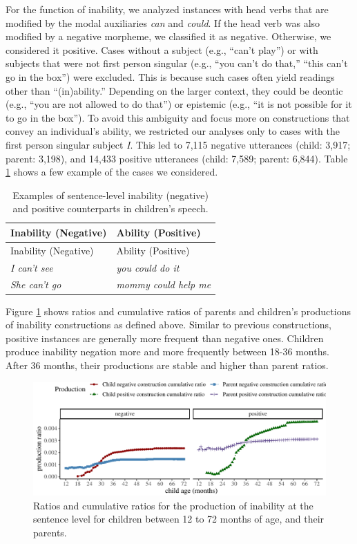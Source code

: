 \documentclass[
  english,
  man,floatsintext]{apa6}
\begin{document}
For the function of inability, we analyzed instances with head verbs that are modified by the modal auxiliaries \emph{can} and \emph{could}. If the head verb was also modified by a negative morpheme, we classified it as negative. Otherwise, we considered it positive. Cases without a subject (e.g., ``can't play'') or with subjects that were not first person singular (e.g., ``you can't do that,'' ``this can't go in the box'') were excluded. This is because such cases often yield readings other than ``(in)ability.'' Depending on the larger context, they could be deontic (e.g., ``you are not allowed to do that'') or epistemic (e.g., ``it is not possible for it to go in the box''). To avoid this ambiguity and focus more on constructions that convey an individual's ability, we restricted our analyses only to cases with the first person singular subject \emph{I}. This led to 7,115 negative utterances (child: 3,917; parent: 3,198), and 14,433 positive utterances (child: 7,589; parent: 6,844). Table \ref{tab:inab} shows a few example of the cases we considered.

\begin{longtable}[]{@{}ll@{}}
\caption{\label{tab:inab} Examples of sentence-level inability (negative) and positive counterparts in children's speech.}\tabularnewline
\toprule
Inability (Negative) & Ability (Positive) \\
\midrule
\endfirsthead
\toprule
Inability (Negative) & Ability (Positive) \\
\midrule
\endhead
\emph{I can't see} & \emph{you could do it} \\
\emph{She can't go} & \emph{mommy could help me} \\
\bottomrule
\end{longtable}

Figure \ref{fig:inability} shows ratios and cumulative ratios of parents and children's productions of inability constructions as defined above. Similar to previous constructions, positive instances are generally more frequent than negative ones. Children produce inability negation more and more frequently between 18-36 months. After 36 months, their productions are stable and higher than parent ratios.

\begin{figure}[H]

{\centering \includegraphics{neg_construction_article_files/figure-latex/inability-1} 

}

\caption{Ratios and cumulative ratios for the production of inability at the sentence level for children between 12 to 72 months of age, and their parents.}\label{fig:inability}
\end{figure}
\end{document}
